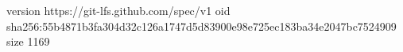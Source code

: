 version https://git-lfs.github.com/spec/v1
oid sha256:55b4871b3fa304d32c126a1747d5d83900e98e725ec183ba34e2047bc7524909
size 1169
